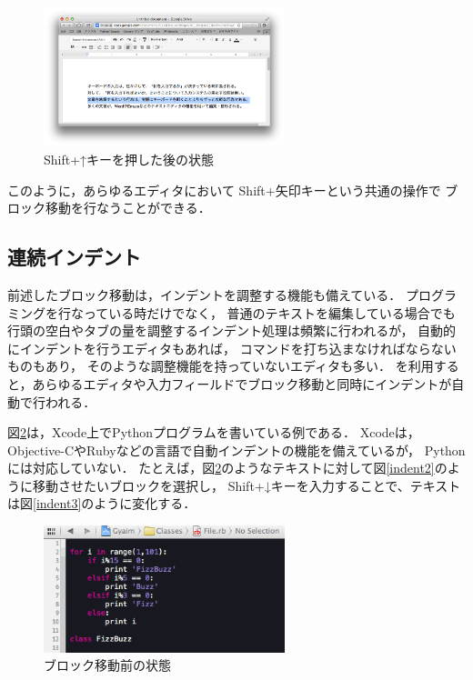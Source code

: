 \begin{figure}[H]
\centerline{\includegraphics[width=70mm,bb=0 0 935 542]{figures/block5.png}}
\caption{Shift+↑キーを押した後の状態}
\label{move4}
\end{figure}

このように，あらゆるエディタにおいて
Shift+矢印キーという共通の操作で
ブロック移動を行なうことができる．

\subsection{連続インデント}

前述したブロック移動は，インデントを調整する機能も備えている．
プログラミングを行なっている時だけでなく，
普通のテキストを編集している場合でも
行頭の空白やタブの量を調整するインデント処理は頻繁に行われるが，
自動的にインデントを行うエディタもあれば，
コマンドを打ち込まなければならないものもあり，
そのような調整機能を持っていないエディタも多い．
{\system}を利用すると，あらゆるエディタや入力フィールドでブロック移動と同時にインデントが自動で行われる．

図\ref{indent1}は，Xcode上でPythonプログラムを書いている例である．
Xcodeは，Objective-CやRubyなどの言語で自動インデントの機能を備えているが，
Pythonには対応していない．
たとえば，図\ref{indent1}のようなテキストに対して図\ref{indent2}のように移動させたいブロックを選択し，
Shift+↓キーを入力することで、テキストは図\ref{indent3}のように変化する．

\begin{figure}[H]
\centerline{\includegraphics[width=70mm,bb=0 0 360 190]{figures/indent1.png}}
\caption{ブロック移動前の状態}
\label{indent1}
\end{figure}

